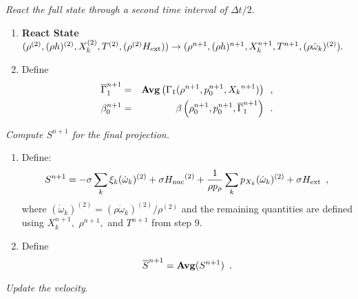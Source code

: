 \documentclass[11pt]{article}
\newcommand{\gammabar}{\overline{\Gamma}_1}
\newcommand{\Hext}{{H_{\rm ext}}}
\newcommand{\Hnuc}{{H_{\rm nuc}}}
\newcommand{\dt}{\Delta t}
\newcommand{\omegadot}{\dot{\omega}}
\begin{document}
 {\em React the full state through a second time interval of $\dt / 2.$}

\begin{enumerate}
\renewcommand{\theenumi}{{\bf \alph{enumi}}}

\item {\bf React State}$(\rho^{(2)},(\rho h)^{(2)}, X_k^{(2)},T^{(2)}, (\rho^{(2)} \Hext) )
                   \rightarrow (\rho^{n+1}, (\rho h)^{n+1}, X_k^{n+1}, T^{n+1}, 
                               (\rho \omegadot_k)^{(2)} ).$  

\item Define
\begin{eqnarray}
 \gammabar^{n+1}    &=& {\rm{\bf Avg}}\left(\Gamma_1(\rho^{n+1}, p_0^{n+1}, {X_k}^{n+1}) \right) \enskip , \nonumber \\ 
 {\beta   }_0^{n+1}    &=& \beta   \left(\rho_0^{n+1}, p_0^{n+1},   \gammabar^{n+1}\right) \enskip .
\end{eqnarray}

\end{enumerate}

 {\em Compute $S^{n+1}$ for the final projection.}

\begin{enumerate}
\renewcommand{\theenumi}{{\bf \alph{enumi}}}
\item Define:
\begin{equation}
  S^{n+1} =  -\sigma  \sum_k  \xi_k (\omegadot_k)^{(2)}  + \sigma \Hnuc^{(2)} +
  \frac{1}{\rho p_\rho} \sum_k p_{X_k}  ({\omegadot}_k)^{(2)}  
   + \sigma \Hext \enskip ,
\end{equation}
where $(\omegadot_k)^{(2)} = (\rho \omegadot_k)^{(2)} / \rho^{(2)}$
and the remaining quantities are defined using $X_k^{n+1},$ $\rho^{n+1},$
and $T^{n+1}$ from step 9.

\item Define
\[
\overline{S}^{n+1} = {\mathrm{\bf Avg}} (S^{n+1}) \enskip.
\]

\end{enumerate}


 {\em Update the velocity}.  
\end{document}
